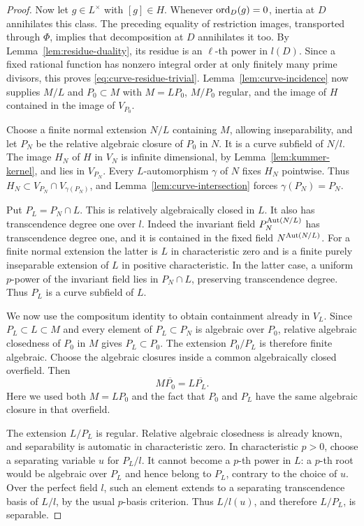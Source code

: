 \begin{proof}
Now let $g\in L^\times$ with $[g]\in H$.  Whenever $\operatorname{ord}_D(g)=0$,
inertia at $D$ annihilates this class.  The preceding equality of
restriction images, transported through $\Phi$, implies that decomposition
at $D$ annihilates it too.  By Lemma~\ref{lem:residue-duality}, its
residue is an $\ell$-th power in $l(D)$.  Since a fixed rational function
has nonzero integral order at only finitely many prime divisors, this
proves \eqref{eq:curve-residue-trivial}.  Lemma~\ref{lem:curve-incidence}
now supplies $M/L$ and $P_0\subset M$ with $M=LP_0$, $M/P_0$ regular,
and the image of $H$ contained in the image of $V_{P_0}$.

Choose a finite normal extension $N/L$ containing $M$, allowing
inseparability, and let $P_N$ be the relative algebraic closure of $P_0$
in $N$.  It is a curve subfield of $N/l$.  The image $H_N$ of $H$ in
$V_N$ is infinite dimensional, by Lemma~\ref{lem:kummer-kernel}, and
lies in $V_{P_N}$.  Every $L$-automorphism $\gamma$ of $N$ fixes $H_N$
pointwise.  Thus $H_N\subset V_{P_N}\cap V_{\gamma(P_N)}$, and
Lemma~\ref{lem:curve-intersection} forces $\gamma(P_N)=P_N$.

Put $P_L=P_N\cap L$.  This is relatively algebraically closed in $L$.
It also has transcendence degree one over $l$.  Indeed the invariant
field $P_N^{\operatorname{Aut}(N/L)}$ has transcendence degree one, and it is contained
in the fixed field $N^{\operatorname{Aut}(N/L)}$.  For a finite normal extension the
latter is $L$ in characteristic zero and is a finite purely inseparable
extension of $L$ in positive characteristic.  In the latter case, a
uniform $p$-power of the invariant field lies in $P_N\cap L$, preserving
transcendence degree.  Thus $P_L$ is a curve subfield of $L$.

We now use the compositum identity to obtain containment already in
$V_L$.  Since $P_L\subset L\subset M$ and every element of
$P_L\subset P_N$ is algebraic over $P_0$, relative algebraic closedness
of $P_0$ in $M$ gives
$P_L\subset P_0$.  The extension $P_0/P_L$ is therefore finite algebraic.
Choose the algebraic closures inside a common algebraically closed
overfield.  Then
\begin{equation}
\label{eq:curve-exact-descent}
                          M\overline{P_0}=L\overline{P_L}.
\end{equation}
Here we used both $M=LP_0$ and the fact that $P_0$ and $P_L$ have the
same algebraic closure in that overfield.

The extension $L/P_L$ is regular.  Relative algebraic closedness is
already known, and separability is automatic in characteristic zero.
In characteristic $p>0$, choose a separating variable $u$ for $P_L/l$.
It cannot become a $p$-th power in $L$: a $p$-th root would be algebraic
over $P_L$ and hence belong to $P_L$, contrary to the choice of $u$.
Over the perfect field $l$, such an element extends to a separating
transcendence basis of $L/l$, by the usual $p$-basis criterion.  Thus
$L/l(u)$, and therefore $L/P_L$, is separable.


\end{proof}
